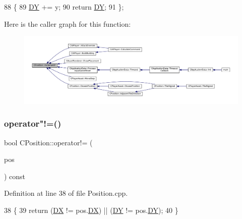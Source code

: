 \begin{DoxyCode}
88                              \{
89             \hyperlink{classCPosition_a84139c9e8eb547e7cf3cb851739943a4}{DY} += y;
90             \textcolor{keywordflow}{return} \hyperlink{classCPosition_a84139c9e8eb547e7cf3cb851739943a4}{DY};
91         \};
\end{DoxyCode}
Here is the caller graph for this function\+:\nopagebreak
\begin{figure}[H]
\begin{center}
\leavevmode
\includegraphics[width=350pt]{classCPosition_a3f2a26798bb27b1252ff1be303b3adfc_icgraph}
\end{center}
\end{figure}
\hypertarget{classCPosition_ad7a23f4b734883e26de15c2487218b07}{}\label{classCPosition_ad7a23f4b734883e26de15c2487218b07} 
\subsubsection{\texorpdfstring{operator"!=()}{operator!=()}}
{\footnotesize\ttfamily bool C\+Position\+::operator!= (\begin{DoxyParamCaption}\item[{const \hyperlink{classCPosition}{C\+Position} \&}]{pos }\end{DoxyParamCaption}) const}



Definition at line 38 of file Position.\+cpp.


\begin{DoxyCode}
38                                                     \{
39     \textcolor{keywordflow}{return} (\hyperlink{classCPosition_a28445f9b872169715919074d82044eda}{DX} != pos.\hyperlink{classCPosition_a28445f9b872169715919074d82044eda}{DX}) || (\hyperlink{classCPosition_a84139c9e8eb547e7cf3cb851739943a4}{DY} != pos.\hyperlink{classCPosition_a84139c9e8eb547e7cf3cb851739943a4}{DY});
40 \}
\end{DoxyCode}
\hypertarget{classCPosition_ae131ec912eb7272d2bdfbdcbb7848acb}{}\label{classCPosition_ae131ec912eb7272d2bdfbdcbb7848acb} 
